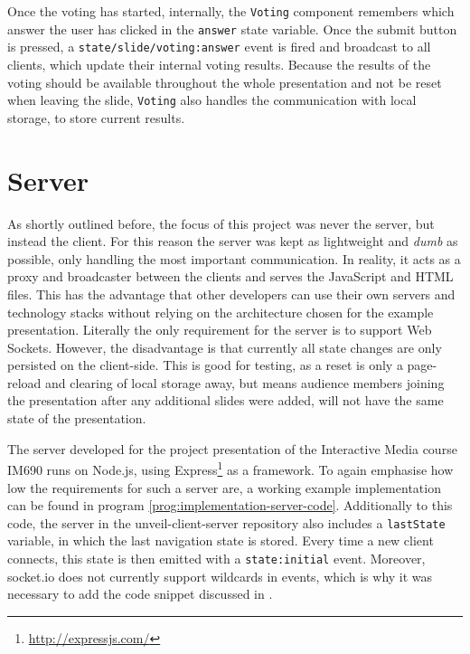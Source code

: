 Once the voting has started, internally, the \texttt{Voting} component remembers which answer the user has clicked in the \texttt{answer} state variable. Once the submit button is pressed, a \texttt{state/slide/voting:answer} event is fired and broadcast to all clients, which update their internal voting results.
Because the results of the voting should be available throughout the whole presentation and not be reset when leaving the slide, \texttt{Voting} also handles the communication with local storage, to store current results.

\section{Server}
\label{sec:implementation-server}
As shortly outlined before, the focus of this project was never the server, but instead the client. For this reason the server was kept as lightweight and \emph{dumb} as possible, only handling the most important communication. In reality, it acts as a proxy and broadcaster between the clients and serves the JavaScript and HTML files. This has the advantage that other developers can use their own servers and technology stacks without relying on the architecture chosen for the example presentation. Literally the only requirement for the server is to support Web Sockets. However, the disadvantage is that currently all state changes are only persisted on the client-side. This is good for testing, as a reset is only a page-reload and clearing of local storage away, but means audience members joining the presentation after any additional slides were added, will not have the same state of the presentation.

The server developed for the project presentation of the Interactive Media course IM690 runs on Node.js, using Express\footnote{\url{http://expressjs.com/}} as a framework. To again emphasise how low the requirements for such a server are, a working example implementation can be found in program \ref{prog:implementation-server-code}. Additionally to this code, the server in the unveil-client-server repository also includes a \texttt{lastState} variable, in which the last navigation state is stored. Every time a new client connects, this state is then emitted with a \texttt{state:initial} event. Moreover, socket.io does not currently support wildcards in events, which is why it was necessary to add the code snippet discussed in \cite{socket-io-wildcards}.

